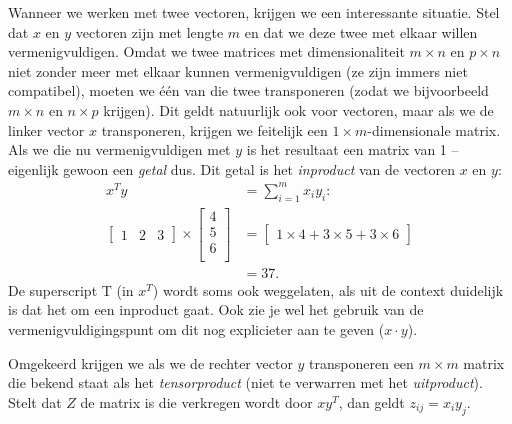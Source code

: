 Wanneer we werken met twee vectoren, krijgen we een interessante situatie. Stel dat $x$ en $y$ vectoren zijn met lengte $m$ en dat we deze twee met elkaar willen vermenigvuldigen. Omdat we twee matrices met dimensionaliteit $m \times n$ en $p \times n$ niet zonder meer met elkaar kunnen vermenigvuldigen (ze zijn immers niet compatibel), moeten we één van die twee transponeren (zodat we bijvoorbeeld $m \times n$ en $n \times p$ krijgen). Dit geldt natuurlijk ook voor vectoren, maar als we de linker vector $x$ transponeren, krijgen we feitelijk een $1 \times m$-dimensionale matrix. Als we die nu vermenigvuldigen met $y$ is het resultaat een matrix van 1  – eigenlijk gewoon een \textit{getal} dus. Dit getal is het \textit{inproduct} van de vectoren $x$ en $y$:
\[
\begin{aligned}
x^Ty &= \sum_{i=1}^m{x_iy_i}: \\
\begin{bmatrix}
1 & 2 & 3
\end{bmatrix} \times
\begin{bmatrix}
4\\5\\6\\
\end{bmatrix} &= 
\begin{bmatrix}
1 \times 4 + 3 \times 5 + 3 \times 6
\end{bmatrix}\\
&=37.
\end{aligned}
\]
%
De superscript T (in $x^T$) wordt soms ook weggelaten, als uit de context duidelijk is dat het om een inproduct gaat. Ook zie je wel het gebruik van de vermenigvuldigingspunt om dit nog explicieter aan te geven ($x \cdot y$). 

Omgekeerd krijgen we als we de rechter vector $y$ transponeren een $m \times m$ matrix die bekend staat als het \textit{tensorproduct} (niet te verwarren met het \textit{uitproduct}). Stelt dat $Z$ de matrix is die verkregen wordt door $xy^T$, dan geldt $z_{ij}=x_iy_j$. 

